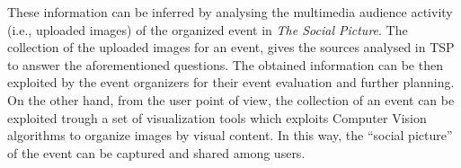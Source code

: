 These information can be inferred by analysing the multimedia audience activity (i.e., uploaded images) of the organized event in \textit{The Social Picture}. The collection of the uploaded images for an event, gives the sources analysed in TSP to answer the aforementioned questions. The obtained information can be then exploited by the event organizers for their event evaluation and further planning.
On the other hand, from the user point of view, the collection of an event can be exploited trough a set of visualization tools which exploits Computer Vision algorithms to organize images by visual content. In this way, the ``social picture'' of the event can be captured and shared among users.


